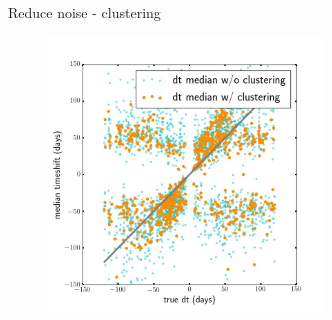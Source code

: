 \documentclass[9pt]{beamer}
\begin{document}

\begin{frame}{Reduce noise - clustering}
  \begin{figure}
    \includegraphics[width=0.65\textwidth]{Fig4.jpg}
  \end{figure}
\end{frame}
\end{document}

